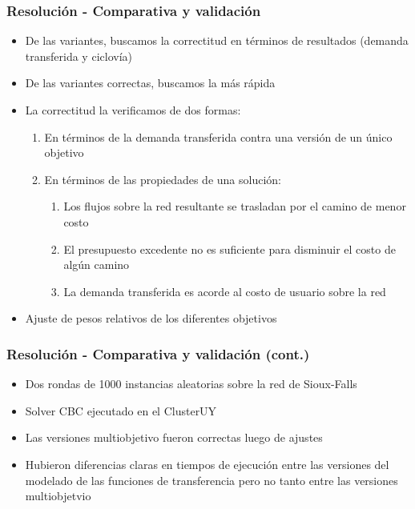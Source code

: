 \documentclass[aspectratio=43, 10pt]{beamer}
\begin{document}
\begin{frame}
    \frametitle{Resolución - Comparativa y validación}

    \begin{itemize}
        \item{De las variantes, buscamos la correctitud en términos de resultados (demanda transferida y ciclovía)}
        \item{De las variantes correctas, buscamos la más rápida}
        \item{La correctitud la verificamos de dos formas:
             \begin{enumerate}
                \item{En términos de la demanda transferida contra una versión de un único objetivo}
                \item{En términos de las propiedades de una solución:
                    \begin{enumerate}
                        \item{Los flujos sobre la red resultante se trasladan por el camino de menor costo}
                        \item{El presupuesto excedente no es suficiente para disminuir el costo de algún camino}
                        \item{La demanda transferida es acorde al costo de usuario sobre la red}
                    \end{enumerate}
                }
            \end{enumerate}
        }
    \item{Ajuste de pesos relativos de los diferentes objetivos}
    \end{itemize}
\end{frame}

\begin{frame}
    \frametitle{Resolución - Comparativa y validación (cont.)}

    \begin{itemize}
        \item{Dos rondas de 1000 instancias aleatorias sobre la red de Sioux-Falls}
        \item{Solver CBC ejecutado en el ClusterUY}
        \item{Las versiones multiobjetivo fueron correctas luego de ajustes}
        \item{Hubieron diferencias claras en tiempos de ejecución entre las versiones
            del modelado de las funciones de transferencia pero no tanto entre las
            versiones multiobjetvio}
    \end{itemize}
\end{frame}
\end{document}
